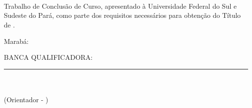 %
%

\makeatletter
\begin{folhadeaprovacao}
	\thispagestyle{empty} %
	\setlength{\baselineskip}{1.5\baselineskip}
	\begin{center}
		
		\textbf{\expandafter\expandafter{\imprimirnomeautor}}\\
		\vspace*{2.1cm} %
		\textbf{\expandafter\uppercase\expandafter{\imprimirtitulotb}}\\
		\abntex@ifnotempty{\imprimirsubtitulo} {%
			\textbf{\expandafter\expandafter{\imprimirsubtitulo}}\\
		}
		
	\end{center}
	
	\vspace*{1.8cm}%
	\hfill %
	\begin{minipage}{8cm} %
		\begin{normalsize} %
			\setlength{\baselineskip}{0.9\baselineskip}
			
			{Trabalho de Conclusão de Curso, apresentado à Universidade Federal do Sul e Sudeste do Pará, como parte dos requisitos necessários para obtenção do Título de \imprimirgrau.}\\				
			
		\end{normalsize} %
	\end{minipage} %

	\vspace*{0.6cm} %
	\normalsize %
	\begin{flushright}
		Marabá: \imprimirdataapresentacao \\ %
	\end{flushright}
	
	\begin{flushleft}
		BANCA QUALIFICADORA:\\
		
		\vspace*{1.45cm} %
		\rule{9cm}{.1 mm}\\
		{\imprimirtitulacaoorientador}{ }{\imprimirorientador}\\
		(Orientador - \imprimirinstOrientador)\\
		

\end{flushleft}
\end{folhadeaprovacao}
